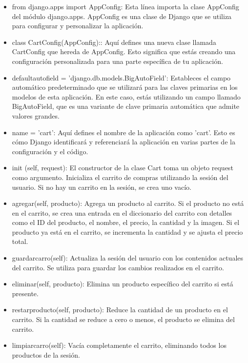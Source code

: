\begin{itemize}
        \item from django.apps import AppConfig: Esta línea importa la clase AppConfig del módulo django.apps. AppConfig es una clase de Django que se utiliza para configurar y personalizar la aplicación.
        \item class CartConfig(AppConfig):: Aquí defines una nueva clase llamada CartConfig que hereda de AppConfig. Esto significa que estás creando una configuración personalizada para una parte específica de tu aplicación.
        \item defaultautofield = 'django.db.models.BigAutoField': Estableces el campo automático predeterminado que se utilizará para las claves primarias en los modelos de esta aplicación. En este caso, estás utilizando un campo llamado BigAutoField, que es una variante de clave primaria automática que admite valores grandes.
        \item name = 'cart': Aquí defines el nombre de la aplicación como 'cart'. Esto es cómo Django identificará y referenciará la aplicación en varias partes de la configuración y el código.
\end{itemize}

\begin{itemize}
        \item init (self, request): El constructor de la clase Cart toma un objeto request como argumento. Inicializa el carrito de compras utilizando la sesión del usuario. Si no hay un carrito en la sesión, se crea uno vacío.
        \item agregar(self, producto): Agrega un producto al carrito. Si el producto no está en el carrito, se crea una entrada en el diccionario del carrito con detalles como el ID del producto, el nombre, el precio, la cantidad y la imagen. Si el producto ya está en el carrito, se incrementa la cantidad y se ajusta el precio total.
        \item guardarcarro(self): Actualiza la sesión del usuario con los contenidos actuales del carrito. Se utiliza para guardar los cambios realizados en el carrito.
        \item eliminar(self, producto): Elimina un producto específico del carrito si está presente.
        \item restarproducto(self, producto): Reduce la cantidad de un producto en el carrito. Si la cantidad se reduce a cero o menos, el producto se elimina del carrito.
        \item limpiarcarro(self): Vacía completamente el carrito, eliminando todos los productos de la sesión.
\end{itemize}
